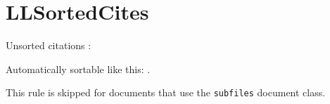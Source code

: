\section{LLSortedCites}

Unsorted citations \cite{refB,refA}: 

Automatically sortable like this: \cite{refA,refB}.

This rule is skipped for documents that use the \texttt{subfiles} document class.
